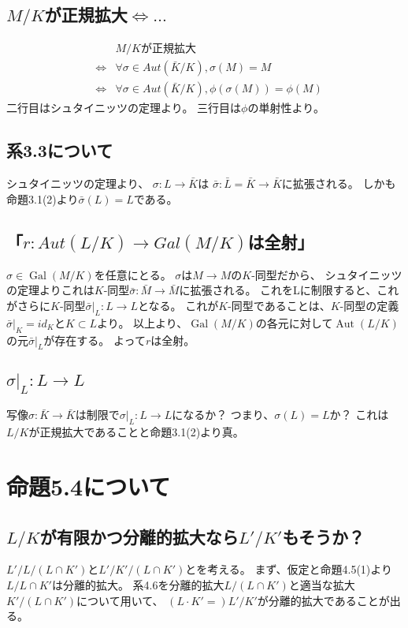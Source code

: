 \documentclass[a4j]{jarticle}
\newcommand{\Aut}{\operatorname{Aut}}
\newcommand{\Gal}{\operatorname{Gal}}
\begin{document}
        \subsection{$M/K$が正規拡大$\iff \dots$}
        \begin{eqnarray*}
            &{}& M/K\mbox{が正規拡大} \\
            &\iff& \forall \sigma \in Aut(\bar{K}/K), \sigma(M)=M \\
            &\iff& \forall \sigma \in Aut(\bar{K}/K), \phi(\sigma(M))=\phi(M)
        \end{eqnarray*}
        二行目はシュタイニッツの定理より。
        三行目は$\phi$の単射性より。

        \subsection{系3.3について}
        シュタイニッツの定理より、
        $\sigma : L \to \bar{K}$は
        $\bar{\sigma}:\bar{L}=\bar{K} \to \bar{K}$に拡張される。
        しかも命題3.1(2)より$\bar{\sigma}(L)=L$である。
        
        \subsection{「$r: Aut(L/K) \to Gal(M/K)$は全射」}
        $\sigma \in \Gal(M/K)$を任意にとる。
        $\sigma$$はM \to M$の$K$-同型だから、
        シュタイニッツの定理よりこれは$K$-同型$\bar{\sigma}: \bar{M} \to \bar{M}$に拡張される。
        これをLに制限すると、これがさらに$K$-同型$\bar{\sigma}|_{L}:L \to L$となる。
        これが$K$-同型であることは、$K$-同型の定義$\bar{\sigma}|_{K}=id_K$と$K \subset L$より。
        以上より、$\Gal(M/K)$の各元に対して$\Aut(L/K)$の元$\bar{\sigma}|_{L}$が存在する。
        よって$r$は全射。
        
        \subsection{$\sigma|_L:L \to L$}
        写像$\sigma : \bar{K} \to \bar{K}$は制限で$\sigma|_L:L \to L$になるか？
        つまり、$\sigma(L)=L$か？
        これは$L/K$が正規拡大であることと命題3.1(2)より真。

    \section{命題5.4について}
        \subsection{$L/K$が有限かつ分離的拡大なら$L'/K'$もそうか？}
        $L'/L/(L \cap K')$と$L'/K'/(L \cap K')$とを考える。
        まず、仮定と命題4.5(1)より$L/L \cap K'$は分離的拡大。
        系4.6を分離的拡大$L/(L \cap K')$と適当な拡大$K'/(L \cap K')$について用いて、
        $(L \cdot K'=)L'/K'$が分離的拡大であることが出る。
\end{document}
